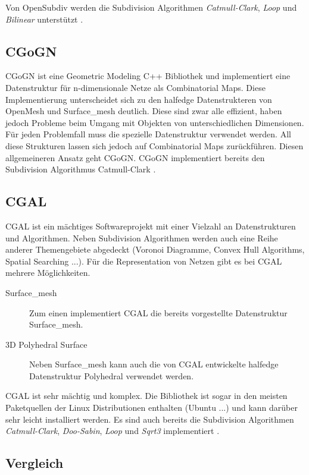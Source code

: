 Von OpenSubdiv werden die Subdivision Algorithmen \emph{Catmull-Clark}, \emph{Loop} und \emph{Bilinear} unterstützt \cite{Pixar.27.07.2015}. 

\subsection{CGoGN}

CGoGN ist eine Geometric Modeling C++ Bibliothek und implementiert eine Datenstruktur für n-dimensionale Netze als Combinatorial Maps.
Diese Implementierung unterscheidet sich zu den halfedge Datenstrukteren von OpenMesh und Surface\_mesh deutlich.
Diese sind zwar alle effizient, haben jedoch Probleme beim Umgang mit Objekten von unterschiedlichen Dimensionen.
Für jeden Problemfall muss die spezielle Datenstruktur verwendet werden.
All diese Strukturen lassen sich jedoch auf Combinatorial Maps zurückführen.
Diesen allgemeineren Ansatz geht CGoGN.
CGoGN implementiert bereits den Subdivision Algorithmus Catmull-Clark \cite{CGoGN.27.07.2015}. 

\subsection{\acf{CGAL}}

\ac{CGAL} ist ein mächtiges Softwareprojekt mit einer Vielzahl an Datenstrukturen und Algorithmen.
Neben Subdivision Algorithmen werden auch eine Reihe anderer Themengebiete abgedeckt (Voronoi Diagramme, Convex Hull Algorithms, Spatial Searching ...).
Für die Representation von Netzen gibt es bei \acs{CGAL} mehrere Möglichkeiten.

\begin{description}
 \item[Surface\_mesh] Zum einen implementiert \acs{CGAL} die bereits vorgestellte Datenstruktur Surface\_mesh.
 \item[3D Polyhedral Surface] Neben Surface\_mesh kann auch die von \acs{CGAL} entwickelte halfedge Datenstruktur Polyhedral verwendet werden.
\end{description}

\acs{CGAL} ist sehr mächtig und komplex. Die Bibliothek ist sogar in den meisten Paketquellen der Linux Distributionen enthalten (Ubuntu ...)
und kann darüber sehr leicht installiert werden.
Es sind auch bereits die Subdivision Algorithmen \emph{Catmull-Clark}, \emph{Doo-Sabin}, \emph{Loop} und \emph{Sqrt3} implementiert \cite{CGAL.27.07.2015}.

\subsection{Vergleich}

